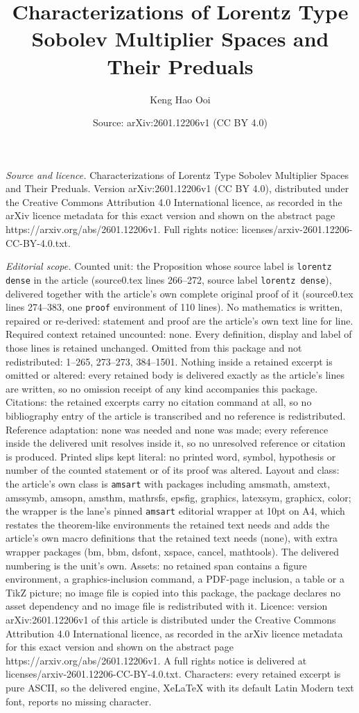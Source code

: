 \documentclass[10pt,a4paper]{amsart}
\title[Characterizations of Lorentz Type Sobolev Multiplier Spaces ]{Characterizations of Lorentz Type Sobolev Multiplier Spaces and Their Preduals}
\author{Keng Hao Ooi}
\date{Source: arXiv:2601.12206v1 (CC BY 4.0)}
\begin{document}
\maketitle

\noindent\emph{Source and licence.} Characterizations of Lorentz Type Sobolev Multiplier Spaces and Their Preduals. Version arXiv:2601.12206v1 (CC BY 4.0), distributed under the Creative Commons Attribution 4.0 International licence, as recorded in the arXiv licence metadata for this exact version and shown on the abstract page https://arxiv.org/abs/2601.12206v1. Full rights notice: licenses/arxiv-2601.12206-CC-BY-4.0.txt.\par\smallskip

\noindent\textit{Editorial scope.} Counted unit: the Proposition whose source label is \texttt{lorentz dense} in the article (source0.tex lines 266--272, source label \texttt{lorentz dense}), delivered together with the article's own complete original proof of it (source0.tex lines 274--383, one \texttt{proof} environment of 110 lines). No mathematics is written, repaired or re-derived: statement and proof are the article's own text line for line. Required context retained uncounted: none. Every definition, display and label of those lines is retained unchanged. Omitted from this package and not redistributed: 1--265, 273--273, 384--1501. Nothing inside a retained excerpt is omitted or altered: every retained body is delivered exactly as the article's lines are written, so no omission receipt of any kind accompanies this package. Citations: the retained excerpts carry no citation command at all, so no bibliography entry of the article is transcribed and no reference is redistributed. Reference adaptation: none was needed and none was made; every reference inside the delivered unit resolves inside it, so no unresolved reference or citation is produced. Printed slips kept literal: no printed word, symbol, hypothesis or number of the counted statement or of its proof was altered. Layout and class: the article's own class is \texttt{amsart} with packages including amsmath, amstext, amssymb, amsopn, amsthm, mathrsfs, epsfig, graphics, latexsym, graphicx, color; the wrapper is the lane's pinned \texttt{amsart} editorial wrapper at 10pt on A4, which restates the theorem-like environments the retained text needs and adds the article's own macro definitions that the retained text needs (none), with extra wrapper packages (bm, bbm, dsfont, xspace, cancel, mathtools). The delivered numbering is the unit's own. Assets: no retained span contains a figure environment, a graphics-inclusion command, a PDF-page inclusion, a table or a TikZ picture; no image file is copied into this package, the package declares no asset dependency and no image file is redistributed with it. Licence: version arXiv:2601.12206v1 of this article is distributed under the Creative Commons Attribution 4.0 International licence, as recorded in the arXiv licence metadata for this exact version and shown on the abstract page https://arxiv.org/abs/2601.12206v1. A full rights notice is delivered at licenses/arxiv-2601.12206-CC-BY-4.0.txt. Characters: every retained excerpt is pure ASCII, so the delivered engine, XeLaTeX with its default Latin Modern text font, reports no missing character.
\end{document}
